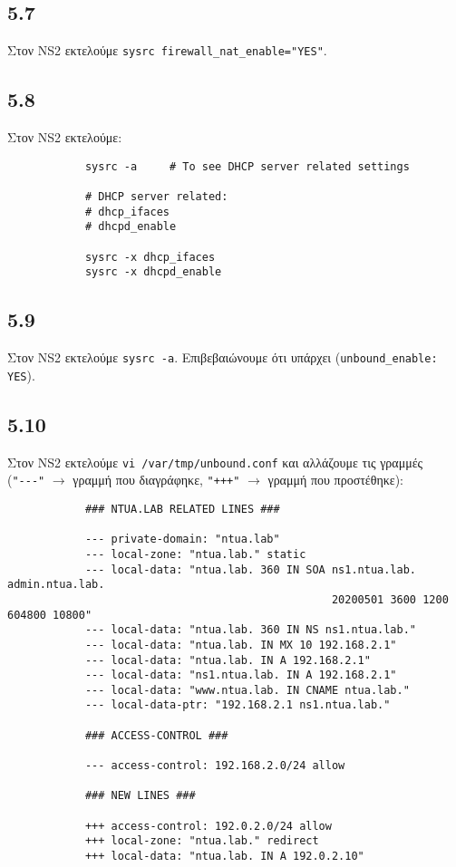 \documentclass[a4paper, 12pt]{article}
\begin{document}
	\subsection*{5.7}
		Στον NS2 εκτελούμε \verb|sysrc firewall_nat_enable="YES"|.

	\subsection*{5.8}
		Στον NS2 εκτελούμε:
		
		\begin{verbatim}
			sysrc -a     # To see DHCP server related settings
			
			# DHCP server related:
			# dhcp_ifaces
			# dhcpd_enable
			
			sysrc -x dhcp_ifaces
			sysrc -x dhcpd_enable
		\end{verbatim}

	\subsection*{5.9}
		Στον NS2 εκτελούμε \verb|sysrc -a|. Επιβεβαιώνουμε ότι υπάρχει (\verb|unbound_enable: YES|).

	\subsection*{5.10}
		Στον NS2 εκτελούμε \verb|vi /var/tmp/unbound.conf| και αλλάζουμε τις γραμμές \\ (\verb|"---"| $\rightarrow$ γραμμή που διαγράφηκε, \verb|"+++"| $\rightarrow$ γραμμή που προστέθηκε):
		
		\begin{verbatim}
			### NTUA.LAB RELATED LINES ###
		
			--- private-domain: "ntua.lab"
			--- local-zone: "ntua.lab." static
			--- local-data: "ntua.lab. 360 IN SOA ns1.ntua.lab. admin.ntua.lab. 
			                                      20200501 3600 1200 604800 10800"
			--- local-data: "ntua.lab. 360 IN NS ns1.ntua.lab."
			--- local-data: "ntua.lab. IN MX 10 192.168.2.1"
			--- local-data: "ntua.lab. IN A 192.168.2.1"
			--- local-data: "ns1.ntua.lab. IN A 192.168.2.1"
			--- local-data: "www.ntua.lab. IN CNAME ntua.lab."
			--- local-data-ptr: "192.168.2.1 ns1.ntua.lab."
			
			### ACCESS-CONTROL ###
			
			--- access-control: 192.168.2.0/24 allow
			
			### NEW LINES ###
			
			+++ access-control: 192.0.2.0/24 allow
			+++ local-zone: "ntua.lab." redirect
			+++ local-data: "ntua.lab. IN A 192.0.2.10"
		\end{verbatim}
\end{document}
